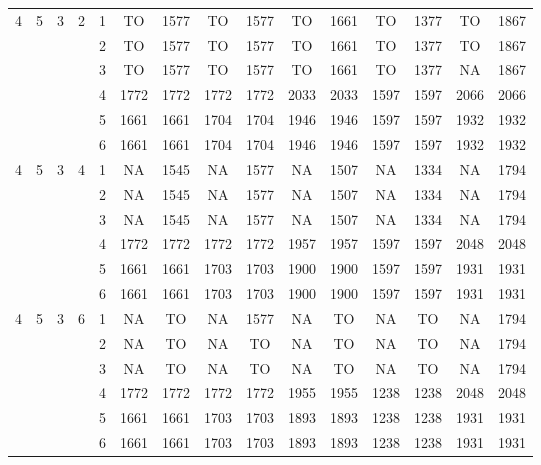 \begin{longtable}{|c|c|c|c|c|c c|c c|c c|c c|c c|}
\multirow{6}{*}{4} & \multirow{6}{*}{5} & \multirow{6}{*}{3} & \multirow{6}{*}{2} & 1 & TO & 1577 & TO & 1577 & TO & 1661 & TO & 1377 & TO & 1867 \\
 & & & & 2 & TO & 1577 & TO & 1577 & TO & 1661 & TO & 1377 & TO & 1867 \\
 & & & & 3 & TO & 1577 & TO & 1577 & TO & 1661 & TO & 1377 & NA & 1867 \\
 & & & & 4 & 1772 & 1772 & 1772 & 1772 & 2033 & 2033 & 1597 & 1597 & 2066 & 2066 \\
 & & & & 5 & 1661 & 1661 & 1704 & 1704 & 1946 & 1946 & 1597 & 1597 & 1932 & 1932 \\
 & & & & 6 & 1661 & 1661 & 1704 & 1704 & 1946 & 1946 & 1597 & 1597 & 1932 & 1932 \\
\hline
\multirow{6}{*}{4} & \multirow{6}{*}{5} & \multirow{6}{*}{3} & \multirow{6}{*}{4} & 1 & NA & 1545 & NA & 1577 & NA & 1507 & NA & 1334 & NA & 1794 \\
 & & & & 2 & NA & 1545 & NA & 1577 & NA & 1507 & NA & 1334 & NA & 1794 \\
 & & & & 3 & NA & 1545 & NA & 1577 & NA & 1507 & NA & 1334 & NA & 1794 \\
 & & & & 4 & 1772 & 1772 & 1772 & 1772 & 1957 & 1957 & 1597 & 1597 & 2048 & 2048 \\
 & & & & 5 & 1661 & 1661 & 1703 & 1703 & 1900 & 1900 & 1597 & 1597 & 1931 & 1931 \\
 & & & & 6 & 1661 & 1661 & 1703 & 1703 & 1900 & 1900 & 1597 & 1597 & 1931 & 1931 \\
\hline
\multirow{6}{*}{4} & \multirow{6}{*}{5} & \multirow{6}{*}{3} & \multirow{6}{*}{6} & 1 & NA & TO & NA & 1577 & NA & TO & NA & TO & NA & 1794 \\
 & & & & 2 & NA & TO & NA & TO & NA & TO & NA & TO & NA & 1794 \\
 & & & & 3 & NA & TO & NA & TO & NA & TO & NA & TO & NA & 1794 \\
 & & & & 4 & 1772 & 1772 & 1772 & 1772 & 1955 & 1955 & 1238 & 1238 & 2048 & 2048 \\
 & & & & 5 & 1661 & 1661 & 1703 & 1703 & 1893 & 1893 & 1238 & 1238 & 1931 & 1931 \\
 & & & & 6 & 1661 & 1661 & 1703 & 1703 & 1893 & 1893 & 1238 & 1238 & 1931 & 1931 \\
\hline
\end{longtable}